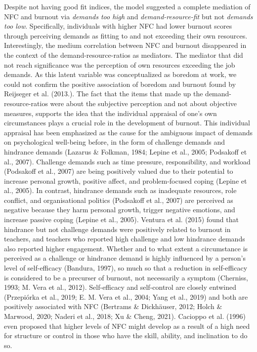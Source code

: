 \documentclass[
  english,
  man,floatsintext]{apa6}
\begin{document}
Despite not having good fit indices, the model suggested a complete mediation of NFC and burnout via \emph{demands too high} and \emph{demand-resource-fit} but not \emph{demands too low}.
Specifically, individuals with higher NFC had lower burnout scores through perceiving demands as fitting to and not exceeding their own resources.
Interestingly, the medium correlation between NFC and burnout disappeared in the context of the demand-resource-ratios as mediators.
The mediator that did not reach significance was the perception of own resources exceeding the job demands.
As this latent variable was conceptualized as boredom at work, we could not confirm the positive association of boredom and burnout found by Reijseger et al. (2013.).
The fact that the items that made up the demand-resource-ratios were about the subjective perception and not about objective measures, supports the idea that the individual appraisal of one's own circumstances plays a crucial role in the development of burnout.
This individual appraisal has been emphasized as the cause for the ambiguous impact of demands on psychological well-being before, in the form of challenge demands and hindrance demands (Lazarus \& Folkman, 1984; Lepine et al., 2005; Podsakoff et al., 2007).
Challenge demands such as time pressure, responsibility, and workload (Podsakoff et al., 2007) are being positively valued due to their potential to increase personal growth, positive affect, and problem-focused coping (Lepine et al., 2005).
In contrast, hindrance demands such as inadequate resources, role conflict, and organisational politics (Podsakoff et al., 2007) are perceived as negative because they harm personal growth, trigger negative emotions, and increase passive coping (Lepine et al., 2005).
Ventura et al. (2015) found that hindrance but not challenge demands were positively related to burnout in teachers, and teachers who reported high challenge and low hindrance demands also reported higher engagement.
Whether and to what extent a circumstance is perceived as a challenge or hindrance demand is highly influenced by a person's level of self-efficacy (Bandura, 1997), so much so that a reduction in self-efficacy is considered to be a precurser of burnout, not necessarily a symptom (Cherniss, 1993; M. Vera et al., 2012).
Self-efficacy and self-control are closely entwined (Przepiórka et al., 2019; E. M. Vera et al., 2004; Yang et al., 2019) and both are positively associated with NFC (Bertrams \& Dickhäuser, 2012; Holch \& Marwood, 2020; Naderi et al., 2018; Xu \& Cheng, 2021).
Cacioppo et al. (1996) even proposed that higher levels of NFC might develop as a result of a high need for structure or control in those who have the skill, ability, and inclination to do so.
\end{document}
